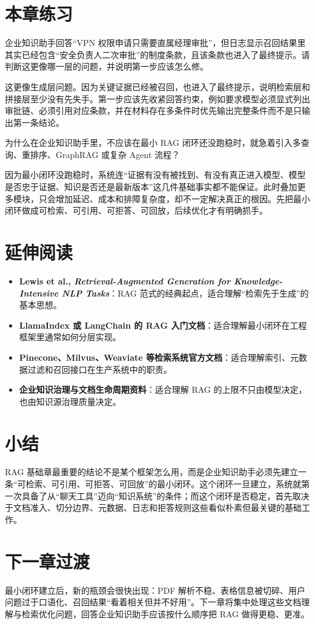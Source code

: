 \section{本章练习}
\begin{exercise}[检索失败还是生成失败]
企业知识助手回答“VPN 权限申请只需要直属经理审批”，但日志显示召回结果里其实已经包含“安全负责人二次审批”的制度条款，且该条款也进入了最终提示。请判断这更像哪一层的问题，并说明第一步应该怎么修。
\end{exercise}

\begin{solution}
这更像{\heiti 生成层问题}。因为关键证据已经被召回，也进入了最终提示，说明检索层和拼接层至少没有先失手。第一步应该先收紧回答约束，例如要求模型必须显式列出审批链、必须引用对应条款，并在材料存在多条件时优先输出完整条件而不是只输出第一条结论。
\end{solution}

\begin{exercise}[为什么先做最小闭环]
为什么在企业知识助手里，不应该在最小 RAG 闭环还没跑稳时，就急着引入多查询、重排序、GraphRAG 或复杂 Agent 流程？
\end{exercise}

\begin{solution}
因为最小闭环没跑稳时，系统连“证据有没有被找到、有没有真正进入模型、模型是否忠于证据、知识是否还是最新版本”这几件基础事实都不能保证。此时叠加更多模块，只会增加延迟、成本和排障复杂度，却不一定解决真正的根因。先把最小闭环做成可检索、可引用、可拒答、可回放，后续优化才有明确抓手。
\end{solution}

\section{延伸阅读}
\begin{itemize}
  \item \textbf{Lewis et al., \emph{Retrieval-Augmented Generation for Knowledge-Intensive NLP Tasks}}：RAG 范式的经典起点，适合理解“检索先于生成”的基本思想。
  \item \textbf{LlamaIndex 或 LangChain 的 RAG 入门文档}：适合理解最小闭环在工程框架里通常如何分层实现。
  \item \textbf{Pinecone、Milvus、Weaviate 等检索系统官方文档}：适合理解索引、元数据过滤和召回接口在生产系统中的职责。
  \item \textbf{企业知识治理与文档生命周期资料}：适合理解 RAG 的上限不只由模型决定，也由知识源治理质量决定。
\end{itemize}

\section{小结}
RAG 基础章最重要的结论不是某个框架怎么用，而是企业知识助手必须先建立一条“可检索、可引用、可拒答、可回放”的最小闭环。这个闭环一旦建立，系统就第一次具备了从“聊天工具”迈向“知识系统”的条件；而这个闭环是否稳定，首先取决于文档准入、切分边界、元数据、日志和拒答规则这些看似朴素但最关键的基础工作。

\section{下一章过渡}
最小闭环建立后，新的瓶颈会很快出现：PDF 解析不稳、表格信息被切碎、用户问题过于口语化、召回结果“看着相关但并不好用”。下一章将集中处理这些文档理解与检索优化问题，回答企业知识助手应该按什么顺序把 RAG 做得更稳、更准。
